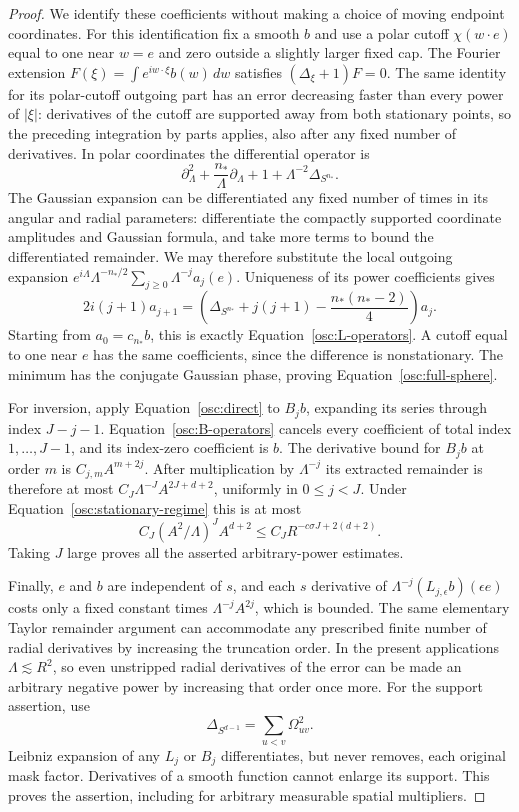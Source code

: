 \begin{proof}
We identify these coefficients without making a choice of moving
endpoint coordinates.  For this identification fix a smooth $b$ and use
a polar cutoff $\chi(w\cdot e)$ equal to one near $w=e$ and zero outside
a slightly larger fixed cap.  The Fourier extension
$F(\xi)=\int e^{iw\cdot\xi}b(w)\,dw$ satisfies
$(\Delta_\xi+1)F=0$.  The same identity for its polar-cutoff outgoing
part has an error decreasing faster than every power of $|\xi|$:
derivatives of the cutoff are supported away from both stationary
points, so the preceding integration by parts applies, also after any
fixed number of derivatives.  In polar coordinates the differential
operator is
\[
 \partial_\Lambda^2+\frac{n_*}{\Lambda}\partial_\Lambda
       +1+\Lambda^{-2}\Delta_{S^{n_*}}.
\]
The Gaussian expansion can be differentiated any fixed number of times
in its angular and radial parameters: differentiate the compactly
supported coordinate amplitudes and Gaussian formula, and take more
terms to bound the differentiated remainder.  We may therefore
substitute the local outgoing expansion
$e^{i\Lambda}\Lambda^{-n_*/2}
\sum_{j\ge0}\Lambda^{-j}a_j(e)$.  Uniqueness of its power coefficients
gives
\[
 2i(j+1)a_{j+1}
  =\left(\Delta_{S^{n_*}}+j(j+1)
                     -\frac{n_*(n_*-2)}4\right)a_j.
\]
Starting from $a_0=c_{n_*}b$, this is exactly
Equation~\eqref{osc:L-operators}.  A cutoff equal to one near $e$ has the
same coefficients, since the difference is nonstationary.  The minimum
has the conjugate Gaussian phase, proving Equation~\eqref{osc:full-sphere}.

For inversion, apply Equation~\eqref{osc:direct} to $B_jb$, expanding its
series through index $J-j-1$.  Equation~\eqref{osc:B-operators} cancels
every coefficient of total index $1,\ldots,J-1$, and its index-zero
coefficient is $b$.  The derivative bound for $B_jb$ at order $m$ is
$C_{j,m}A^{m+2j}$.  After multiplication by $\Lambda^{-j}$ its extracted
remainder is therefore at most
$C_J\Lambda^{-J}A^{2J+d+2}$, uniformly in $0\le j<J$.
Under Equation~\eqref{osc:stationary-regime} this is at most
\[
 C_J(A^2/\Lambda)^J A^{d+2}
 \le C_J R^{-c\sigma J+2(d+2)}.
\]
Taking $J$ large proves all the asserted arbitrary-power estimates.

Finally, $e$ and $b$ are independent of $s$, and each $s$ derivative of
$\Lambda^{-j}(L_{j,\epsilon}b)(\epsilon e)$ costs only a fixed constant
times $\Lambda^{-j}A^{2j}$, which is bounded.  The same elementary
Taylor remainder argument can accommodate any prescribed finite number
of radial derivatives by increasing the truncation order.  In the
present applications $\Lambda\lesssim R^2$, so even unstripped radial
derivatives of the error can be made an arbitrary negative power by
increasing that order once more.  For the support assertion, use
\[
 \Delta_{S^{d-1}}=\sum_{u<v}\Omega_{uv}^2.
\]
Leibniz expansion of any $L_j$ or $B_j$ differentiates, but never removes,
each original mask factor.  Derivatives of a smooth function cannot
enlarge its support.  This proves the assertion, including for arbitrary
measurable spatial multipliers.
\end{proof}

